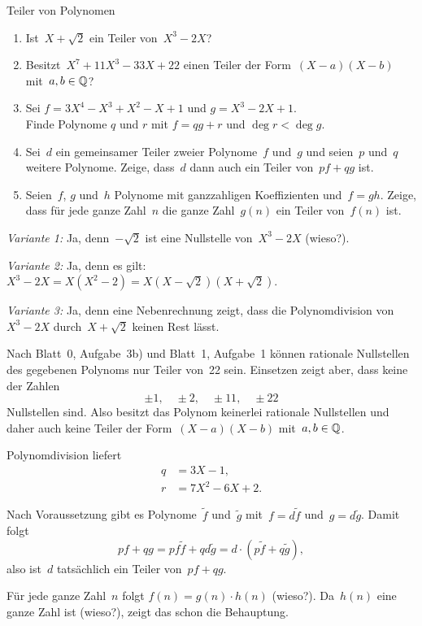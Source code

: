 \documentclass{algblatt}
\begin{document}
\begin{aufgabe}{Teiler von Polynomen}
\begin{enumerate}
\item Ist~$X+\sqrt{2}$ ein Teiler von~$X^3-2X$?
\item Besitzt~$X^7 + 11 X^3 - 33 X + 22$ einen Teiler der
Form~$(X-a)(X-b)$ mit~$a,b \in \mathbb{Q}$?
\item Sei $f = 3 X^4 - X^3 + X^2 - X + 1$ und $g = X^3 - 2 X + 1$. \\
Finde Polynome $q$ und $r$ mit $f = q g + r$ und
$\deg r < \deg g$.
\item Sei~$d$ ein gemeinsamer Teiler zweier Polynome~$f$ und~$g$ und seien~$p$
und~$q$ weitere Polynome.
Zeige, dass~$d$ dann auch ein Teiler von~$pf + qg$ ist.
\item Seien~$f$, $g$ und~$h$ Polynome mit ganzzahligen Koeffizienten und~$f =
gh$. Zeige, dass für jede ganze Zahl~$n$ die ganze Zahl~$g(n)$ ein Teiler
von~$f(n)$ ist.
\end{enumerate}
\begin{loesungE}
\item \emph{Variante 1:} Ja, denn~$-\sqrt{2}$ ist eine Nullstelle von~$X^3 -
2X$ (wieso?).

\emph{Variante 2:} Ja, denn es gilt:
$X^3 - 2X = X (X^2 - 2) = X (X - \sqrt{2}) (X + \sqrt{2})$.

\emph{Variante 3:} Ja, denn eine Nebenrechnung zeigt, dass die Polynomdivision
von~$X^3 - 2X$ durch~$X+\sqrt{2}$ keinen Rest lässt.

\item Nach Blatt~0, Aufgabe~3b) und Blatt~1, Aufgabe~1 können
rationale Nullstellen des gegebenen Polynoms nur Teiler von~22 sein. Einsetzen
zeigt aber, dass keine der Zahlen
\[ \pm 1, \quad \pm 2, \quad \pm 11, \quad \pm 22 \]
Nullstellen sind. Also besitzt das Polynom keinerlei rationale Nullstellen und
daher auch keine Teiler der Form~$(X-a)(X-b)$ mit~$a,b \in \mathbb{Q}$.

\item Polynomdivision liefert
\begin{align*}
  q &= 3X - 1, \\
  r &= 7X^2 - 6X + 2.
\end{align*}

\item Nach Voraussetzung gibt es Polynome~$\tilde f$ und~$\tilde g$ mit~$f = d
\tilde f$ und~$g = d \tilde g$. Damit folgt
\[ pf + qg = pf\tilde f + qd\tilde g = d \cdot (p\tilde f + q\tilde g), \]
also ist~$d$ tatsächlich ein Teiler von~$pf+qg$.

\item Für jede ganze Zahl~$n$ folgt $f(n) = g(n) \cdot h(n)$ (wieso?). Da~$h(n)$ eine
ganze Zahl ist (wieso?), zeigt das schon die Behauptung.
\end{loesungE}
\end{aufgabe}
\end{document}
